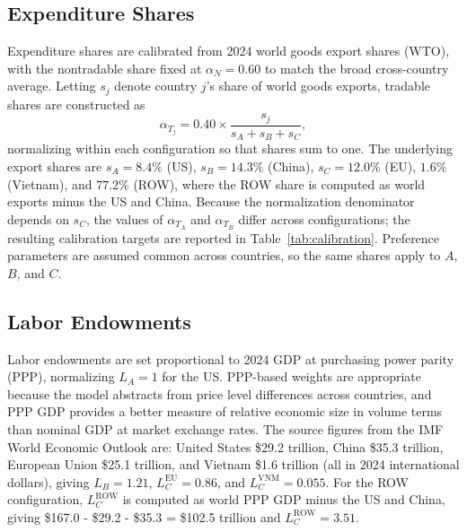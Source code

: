 \documentclass[11pt]{article}
\theoremstyle{plain}
\theoremstyle{remark}
\numberwithin{lemma}{section}
\numberwithin{proposition}{section}
\numberwithin{corollary}{section}
\begin{document}
\begin{appendix}
\subsection*{Expenditure Shares}
Expenditure shares are calibrated from 2024 world goods export shares (WTO), with the nontradable share fixed at $\alpha_N = 0.60$ to match the broad cross-country average. Letting $s_j$ denote country $j$'s share of world goods exports, tradable shares are constructed as
\[
\alpha_{T_j} = 0.40 \times \frac{s_j}{s_A + s_B + s_C},
\]
normalizing within each configuration so that shares sum to one. The underlying export shares are $s_A = 8.4\%$ (US), $s_B = 14.3\%$ (China), $s_C = 12.0\%$ (EU), $1.6\%$ (Vietnam), and $77.2\%$ (ROW), where the ROW share is computed as world exports minus the US and China. Because the normalization denominator depends on $s_C$, the values of $\alpha_{T_A}$ and $\alpha_{T_B}$ differ across configurations; the resulting calibration targets are reported in Table~\ref{tab:calibration}. Preference parameters are assumed common across countries, so the same shares apply to $A$, $B$, and $C$.

\subsection*{Labor Endowments}
Labor endowments are set proportional to 2024 GDP at purchasing power parity (PPP), normalizing $L_A = 1$ for the US. PPP-based weights are appropriate because the model abstracts from price level differences across countries, and PPP GDP provides a better measure of relative economic size in volume terms than nominal GDP at market exchange rates. The source figures from the IMF World Economic Outlook \citep{imf2024weo} are: United States \$29.2 trillion, China \$35.3 trillion, European Union \$25.1 trillion, and Vietnam \$1.6 trillion (all in 2024 international dollars), giving $L_B = 1.21$, $L_C^{\mathrm{EU}} = 0.86$, and $L_C^{\mathrm{VNM}} = 0.055$. For the ROW configuration, $L_C^{\mathrm{ROW}}$ is computed as world PPP GDP minus the US and China, giving \$167.0 - \$29.2 - \$35.3 = \$102.5 trillion and $L_C^{\mathrm{ROW}} = 3.51$.


\end{appendix}
\end{document}
